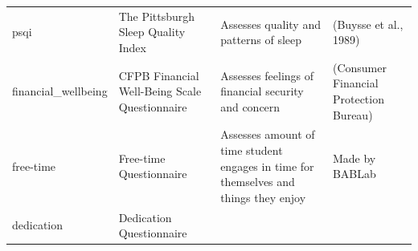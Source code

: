 \documentclass[]{book}
\begin{document}
\begin{longtable}[]{@{}llll@{}}
\begin{minipage}[t]{0.22\columnwidth}
psqi\strut
\end{minipage} & \begin{minipage}[t]{0.27\columnwidth}\raggedright
The Pittsburgh Sleep Quality Index\strut
\end{minipage} & \begin{minipage}[t]{0.22\columnwidth}\raggedright
Assesses quality and patterns of sleep\strut
\end{minipage} & \begin{minipage}[t]{0.18\columnwidth}\raggedright
(Buysse et al., 1989)\strut
\end{minipage}\tabularnewline
\begin{minipage}[t]{0.22\columnwidth}\raggedright
financial\_wellbeing\strut
\end{minipage} & \begin{minipage}[t]{0.27\columnwidth}\raggedright
CFPB Financial Well-Being Scale Questionnaire\strut
\end{minipage} & \begin{minipage}[t]{0.22\columnwidth}\raggedright
Assesses feelings of financial security and concern\strut
\end{minipage} & \begin{minipage}[t]{0.18\columnwidth}\raggedright
(Consumer Financial Protection Bureau)\strut
\end{minipage}\tabularnewline
\begin{minipage}[t]{0.22\columnwidth}\raggedright
free-time\strut
\end{minipage} & \begin{minipage}[t]{0.27\columnwidth}\raggedright
Free-time Questionnaire\strut
\end{minipage} & \begin{minipage}[t]{0.22\columnwidth}\raggedright
Assesses amount of time student engages in time for themselves and things they enjoy\strut
\end{minipage} & \begin{minipage}[t]{0.18\columnwidth}\raggedright
Made by BABLab\strut
\end{minipage}\tabularnewline
\begin{minipage}[t]{0.22\columnwidth}\raggedright
dedication\strut
\end{minipage} & \begin{minipage}[t]{0.27\columnwidth}\raggedright
Dedication Questionnaire\strut
\end{minipage} & \begin{minipage}[t]{0.22\columnwidth}\raggedright

\end{minipage}
\end{longtable}
\end{document}
